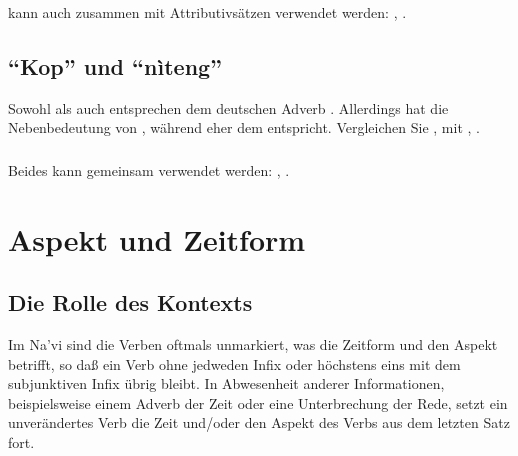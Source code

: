 \subsubsection{}  kann auch zusammen mit Attributivs\"atzen verwendet werden:
, .

\subsubsection{} 

\subsection{"`Kop"' und "`n\`iteng"'} Sowohl  als auch  entsprechen dem
deutschen Adverb . Allerdings hat  die Nebenbedeutung von
, w\"ahrend  eher dem  entspricht. Vergleichen Sie ,  mit , .

\subsubsection{} Beides kann gemeinsam verwendet werden: , .


\section{Aspekt und Zeitform}

\subsection{Die Rolle des Kontexts} Im Na’vi sind die Verben oftmals unmarkiert, was die
Zeitform und den Aspekt betrifft, so da\ss{} ein Verb ohne jedweden Infix oder h\"ochstens
eins mit dem subjunktiven Infix \"ubrig bleibt. In Abwesenheit anderer Informationen,
beispielsweise einem Adverb der Zeit oder eine Unterbrechung der Rede, setzt ein
unver\"andertes Verb die Zeit und/oder den Aspekt des Verbs aus dem letzten Satz fort.

